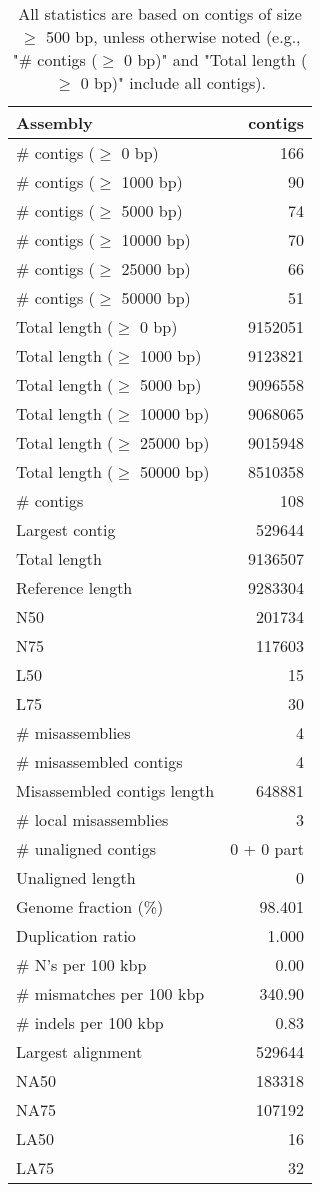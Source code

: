 \documentclass[12pt,a4paper]{article}
\begin{document}
\begin{table}[ht]
\begin{center}
\caption{All statistics are based on contigs of size $\geq$ 500 bp, unless otherwise noted (e.g., "\# contigs ($\geq$ 0 bp)" and "Total length ($\geq$ 0 bp)" include all contigs).}
\begin{tabular}{|l*{1}{|r}|}
\hline
Assembly & contigs \\ \hline
\# contigs ($\geq$ 0 bp) & 166 \\ \hline
\# contigs ($\geq$ 1000 bp) & 90 \\ \hline
\# contigs ($\geq$ 5000 bp) & 74 \\ \hline
\# contigs ($\geq$ 10000 bp) & 70 \\ \hline
\# contigs ($\geq$ 25000 bp) & 66 \\ \hline
\# contigs ($\geq$ 50000 bp) & 51 \\ \hline
Total length ($\geq$ 0 bp) & 9152051 \\ \hline
Total length ($\geq$ 1000 bp) & 9123821 \\ \hline
Total length ($\geq$ 5000 bp) & 9096558 \\ \hline
Total length ($\geq$ 10000 bp) & 9068065 \\ \hline
Total length ($\geq$ 25000 bp) & 9015948 \\ \hline
Total length ($\geq$ 50000 bp) & 8510358 \\ \hline
\# contigs & 108 \\ \hline
Largest contig & 529644 \\ \hline
Total length & 9136507 \\ \hline
Reference length & 9283304 \\ \hline
N50 & 201734 \\ \hline
N75 & 117603 \\ \hline
L50 & 15 \\ \hline
L75 & 30 \\ \hline
\# misassemblies & 4 \\ \hline
\# misassembled contigs & 4 \\ \hline
Misassembled contigs length & 648881 \\ \hline
\# local misassemblies & 3 \\ \hline
\# unaligned contigs & 0 + 0 part \\ \hline
Unaligned length & 0 \\ \hline
Genome fraction (\%) & 98.401 \\ \hline
Duplication ratio & 1.000 \\ \hline
\# N's per 100 kbp & 0.00 \\ \hline
\# mismatches per 100 kbp & 340.90 \\ \hline
\# indels per 100 kbp & 0.83 \\ \hline
Largest alignment & 529644 \\ \hline
NA50 & 183318 \\ \hline
NA75 & 107192 \\ \hline
LA50 & 16 \\ \hline
LA75 & 32 \\ \hline
\end{tabular}
\end{center}
\end{table}
\end{document}
